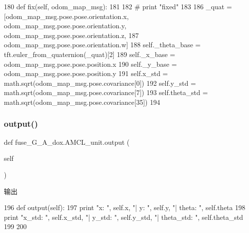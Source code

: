 \begin{DoxyCode}
180     \textcolor{keyword}{def }fix(self, odom\_map\_msg):
181 
182         \textcolor{comment}{# print "fixed"}
183         
186         \_quat = [odom\_map\_msg.pose.pose.orientation.x, odom\_map\_msg.pose.pose.orientation.y, 
      odom\_map\_msg.pose.pose.orientation.z,
187                  odom\_map\_msg.pose.pose.orientation.w]
188         self.\_theta\_base = tft.euler\_from\_quaternion(\_quat)[2]
189         self.\_x\_base = odom\_map\_msg.pose.pose.position.x
190         self.\_y\_base = odom\_map\_msg.pose.pose.position.y
191         self.x\_std = math.sqrt(odom\_map\_msg.pose.covariance[0])
192         self.y\_std = math.sqrt(odom\_map\_msg.pose.covariance[7])
193         self.theta\_std = math.sqrt(odom\_map\_msg.pose.covariance[35])
194 
\end{DoxyCode}
\mbox{\label{classfuse___g___a__dox_1_1_a_m_c_l__unit_ae0075e16c909e7230a2553255f45b8fd}} 
\subsubsection{\texorpdfstring{output()}{output()}}
{\footnotesize\ttfamily def fuse\+\_\+\+G\+\_\+\+A\+\_\+dox.\+A\+M\+C\+L\+\_\+unit.\+output (\begin{DoxyParamCaption}\item[{}]{self }\end{DoxyParamCaption})}



输出 


\begin{DoxyCode}
196     \textcolor{keyword}{def }output(self):
197         \textcolor{keywordflow}{print} \textcolor{stringliteral}{"x: "}, self.x, \textcolor{stringliteral}{"| y: "}, self.y, \textcolor{stringliteral}{"| theta: "}, self.theta
198         \textcolor{keywordflow}{print} \textcolor{stringliteral}{"x\_std: "}, self.x\_std, \textcolor{stringliteral}{"| y\_std: "}, self.y\_std, \textcolor{stringliteral}{"| theta\_std: "}, self.theta\_std
199 
200 
\end{DoxyCode}
\mbox{\label{classfuse___g___a__dox_1_1_a_m_c_l__unit_a0a0619c5c86913eff529d9f539e01ebc}} 
